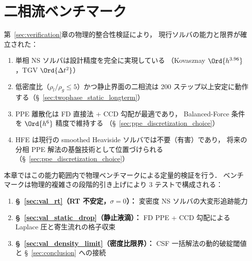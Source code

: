 %
%

\section{二相流ベンチマーク}
\label{sec:validation}
\label{sec:benchmarks}


第~\ref{sec:verification}章の物理的整合性検証により，
現行ソルバの能力と限界が確立された：
\begin{enumerate}[noitemsep]
  \item 単相 NS ソルバは設計精度を完全に実現している
        （Kovasznay $\Ord{h^{3.96}}$，TGV $\Ord{\Delta t^2}$）
  \item 低密度比（$\rho_l/\rho_g \leq 5$）かつ静止界面の二相流は
        200 ステップ以上安定に動作する（§~\ref{sec:twophase_static_longterm}）
  \item PPE 離散化は FD 直接法 + CCD 勾配が最適であり，
        Balanced-Force 条件を $\Ord{h^6}$ 精度で維持する
        （§~\ref{sec:ppe_discretization_choice}）
  \item HFE は現行の smoothed Heaviside ソルバでは不要（有害）であり，
        将来の分相 PPE 解法の基盤技術として位置づけられる
        （§~\ref{sec:ppe_discretization_choice}）
\end{enumerate}

\noindent
本章ではこの能力範囲内で物理ベンチマークによる定量的検証を行う．
ベンチマークは物理的複雑さの段階的引き上げにより 3 テストで構成される：
\begin{enumerate}[noitemsep]
  \item \textbf{§~\ref{sec:val_rt}（RT 不安定，$\sigma = 0$）：}
        変密度 NS ソルバの大変形追跡能力
  \item \textbf{§~\ref{sec:val_static_drop}（静止液滴）：}
        FD PPE + CCD 勾配による Laplace 圧と寄生流れの格子収束
  \item \textbf{§~\ref{sec:val_density_limit}（密度比限界）：}
        CSF 一括解法の動的破綻閾値と §~\ref{sec:conclusion} への接続
\end{enumerate}

